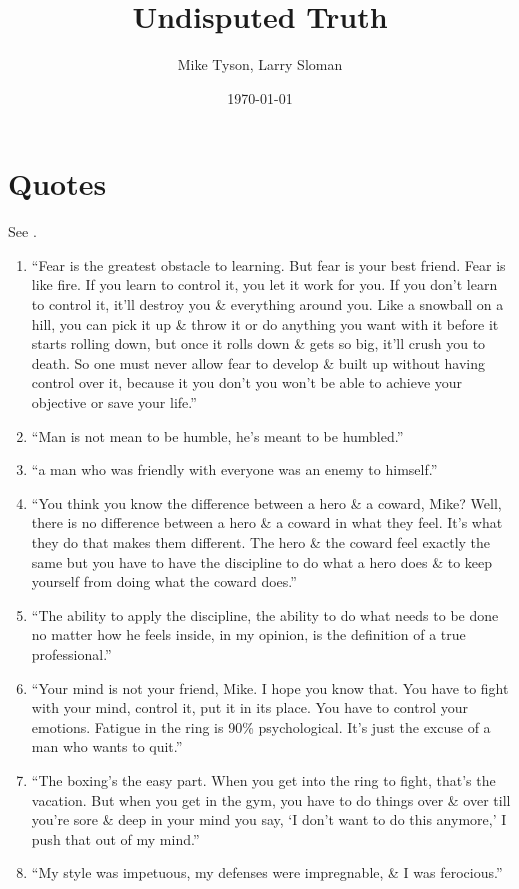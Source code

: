 \documentclass{article}
\title{Undisputed Truth}
\author{Mike Tyson, Larry Sloman}
\date{\today}
\numberwithin{equation}{section}
\begin{document}
\maketitle
\tableofcontents


\section{Quotes}
See \cite{Tyson_Sloman2013}.
\begin{enumerate}
	\item ``Fear is the greatest obstacle to learning. But fear is your best friend. Fear is like fire. If you learn to control it, you let it work for you. If you don't learn to control it, it'll destroy you \& everything around you. Like a snowball on a hill, you can pick it up \& throw it or do anything you want with it before it starts rolling down, but once it rolls down \& gets so big, it'll crush you to death. So one must never allow fear to develop \& built up without having control over it, because it you don't you won't be able to achieve your objective or save your life.''
	\item ``Man is not mean to be humble, he's meant to be humbled.''
	\item ``a man who was friendly with everyone was an enemy to himself.''
	\item ``You think you know the difference between a hero \& a coward, Mike? Well, there is no difference between a hero \& a coward in what they feel. It's what they do that makes them different. The hero \& the coward feel exactly the same but you have to have the discipline to do what a hero does \& to keep yourself from doing what the coward does.''
	\item ``The ability to apply the discipline, the ability to do what needs to be done no matter how he feels inside, in my opinion, is the definition of a true professional.''
	\item ``Your mind is not your friend, Mike. I hope you know that. You have to fight with your mind, control it, put it in its place. You have to control your emotions. Fatigue in the ring is 90\% psychological. It's just the excuse of a man who wants to quit.''
	\item ``The boxing's the easy part. When you get into the ring to fight, that's the vacation. But when you get in the gym, you have to do things over \& over till you're sore \& deep in your mind you say, `I don't want to do this anymore,' I push that out of my mind.''
	\item ``My style was impetuous, my defenses were impregnable, \& I was ferocious.''
\end{enumerate}


\printbibliography[heading=bibintoc]
	
\end{document}

